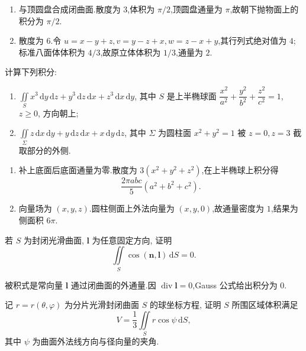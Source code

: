 \begin{solution}
    \begin{enumerate}
        \item 与顶圆盘合成闭曲面.散度为 $3$,体积为 $\pi/2$,顶圆盘通量为 $\pi$,故朝下抛物面上的积分为 $\pi/2$.
        \item 散度为 $6$.令
              $u=x-y+z,v=y-z+x,w=z-x+y$,其行列式绝对值为 $4$;标准八面体体积为 $4/3$,故原立体体积为 $1/3$,通量为 $2$.
    \end{enumerate}
\end{solution}

\begin{example}
    计算下列积分:
    \begin{enumerate}
        \item $\displaystyle\iint\limits_Sx^3\,\mathrm{d}y\,\mathrm{d}z+y^3\,\mathrm{d}z\,\mathrm{d}x+z^3\,\mathrm{d}x\,\mathrm{d}y$, 其中 $S$ 是上半椭球面 $\dfrac{x^2}{a^2}+\dfrac{y^2}{b^2}+\dfrac{z^2}{c^2}=1$, $z\geq0$, 方向朝上;
        \item $\displaystyle\iint\limits_\Sigma z\,\mathrm{d}x\,\mathrm{d}y+y\,\mathrm{d}z\,\mathrm{d}x+x\,\mathrm{d}y\,\mathrm{d}z$, 其中 $\Sigma$ 为圆柱面 $x^2+y^2=1$ 被 $z=0,z=3$ 截取部分的外侧.
    \end{enumerate}
\end{example}
\exampleblank

\begin{solution}
    \begin{enumerate}
        \item 补上底面后底面通量为零.散度为 $3(x^2+y^2+z^2)$,在上半椭球上积分得
              \[
                  \dfrac{2\pi abc}{5}(a^2+b^2+c^2).
              \]
        \item 向量场为 $(x,y,z)$.圆柱侧面上外法向量为 $(x,y,0)$,故通量密度为 $1$,结果为侧面积 $6\pi$.
    \end{enumerate}
\end{solution}

\begin{example}
    若 $S$ 为封闭光滑曲面, $\bm l$ 为任意固定方向, 证明
    \[
        \iint\limits_S\cos(\bm n,\bm l)\,\mathrm{d}S=0.
    \]
\end{example}
\exampleblank

\begin{solution}
    被积式是常向量 $\bm l$ 通过闭曲面的外通量.因 $\operatorname{div}\bm l=0$,Gauss 公式给出积分为 $0$.
\end{solution}

\begin{example}
    记 $r=r(\theta,\varphi)$ 为分片光滑封闭曲面 $S$ 的球坐标方程, 证明 $S$ 所围区域体积满足
    \[
        V=\dfrac{1}{3}\iint\limits_Sr\cos\psi\,\mathrm{d}S,
    \]
    其中 $\psi$ 为曲面外法线方向与径向量的夹角.
\end{example}
\exampleblank


